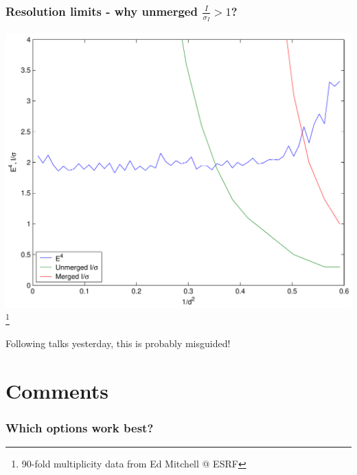 \documentclass[slides,compress]{beamer}
\begin{document}
\begin{frame}
\frametitle{Resolution limits - why unmerged $\frac{I}{\sigma_I} > 1$?}
\hspace{6cm}
\includegraphics[scale=0.5]{figures/plat-13A-z4.pdf}
\footnote{90-fold multiplicity data from Ed Mitchell @ ESRF}
\end{frame}

\begin{frame}
\begin{center}
\Huge Following talks yesterday, this is probably misguided!
\end{center}
\end{frame}

\section{Comments}

\begin{frame}
\frametitle{Which options work best?}
\begin{itemize}
\end{itemize}
\end{frame}
\end{document}
